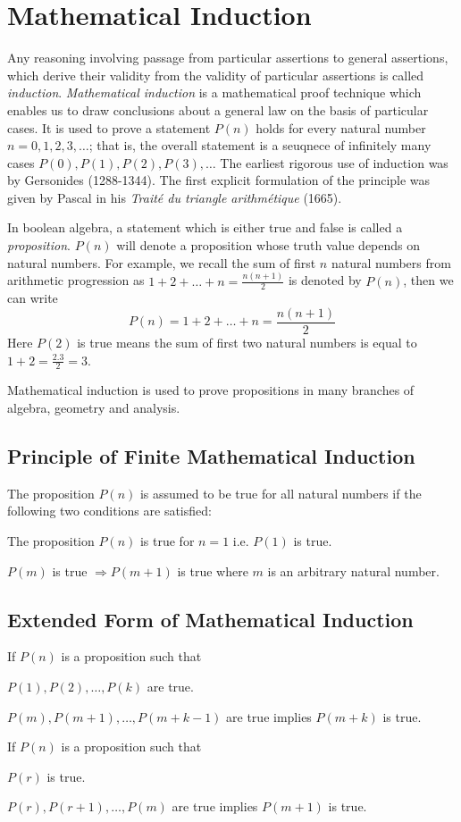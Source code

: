 \chapter{Mathematical Induction}
Any reasoning involving passage from particular assertions to general assertions, which derive their validity from the validity of
particular assertions is called {\it induction}. {\it Mathematical induction} is a mathematical proof technique which enables us to
draw conclusions about a general law on the basis of particular cases. It is used to prove a statement $P(n)$ holds for every
natural number $n = 0, 1, 2, 3, \ldots$; that is, the overall statement is a seuqnece of infinitely many cases $P(0), P(1), P(2),
P(3), \ldots$ The earliest rigorous use of induction was by Gersonides (1288-1344). The first explicit formulation of the principle
was given by Pascal in his {\it Trait\'e du triangle arithm\'etique} (1665).

In boolean algebra, a statement which is either true and false is called a {\it proposition}. $P(n)$ will denote a proposition
whose truth value depends on natural numbers. For example, we recall the sum of first $n$ natural numbers from arithmetic
progression as $1 + 2 + \ldots + n = \frac{n(n + 1)}{2}$ is denoted by $P(n)$, then we can write
$$P(n) = 1 + 2 + \ldots + n = \frac{n(n + 1)}{2}$$
Here $P(2)$ is true means the sum of first two natural numbers is equal to $1 + 2 = \frac{2.3}{2} = 3$.

Mathematical induction is used to prove propositions in many branches of algebra, geometry and analysis.

\section{Principle of Finite Mathematical Induction}
The proposition $P(n)$ is assumed to be true for all natural numbers if the following two conditions are satisfied:
\startitemize[n]
\item The proposition $P(n)$ is true for $n = 1$ i.e. $P(1)$ is true.
\item $P(m)$ is true $\Rightarrow P(m + 1)$ is true where $m$ is an arbitrary natural number.
\stopitemize

\section{Extended Form of Mathematical Induction}
\startitemize[n]
\item If $P(n)$ is a proposition such that
  \startitemize[n]
  \item $P(1), P(2), \ldots, P(k)$ are true.
  \item $P(m), P(m + 1), \ldots, P(m + k - 1)$ are true implies $P(m + k)$ is true.
  \stopitemize
\item If $P(n)$ is a proposition such that
  \startitemize[n]
  \item $P(r)$ is true.
  \item $P(r), P(r + 1), \ldots, P(m)$ are true implies $P(m + 1)$ is true.
  \stopitemize
\stopitemize

